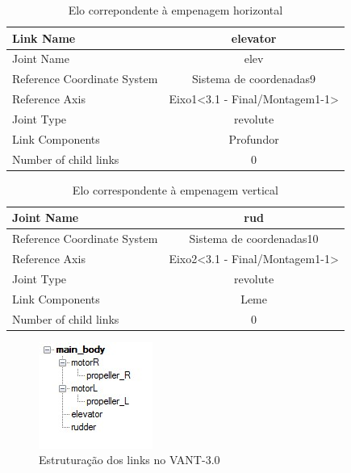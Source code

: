 \begin{table}[htbp]
\centering
\begin{tabular}{|l|c|c|c|c|}
\hline
Link Name  & \multicolumn{4}{c|}{elevator} \\
\hline
Joint Name  & \multicolumn{4}{c|}{elev} \\
\hline
Reference Coordinate System   & \multicolumn{4}{c|}{Sistema de coordenadas9} \\
\hline
Reference Axis  & \multicolumn{4}{c|}{Eixo1<3.1 - Final/Montagem1-1>} \\
\hline
Joint Type  & \multicolumn{4}{c|}{revolute} \\
\hline
Link Components   & \multicolumn{4}{c|}{Profundor} \\
\hline
Number of child links  & \multicolumn{4}{c|}{0} \\
\hline
\end{tabular}%
\caption{Elo correpondente à empenagem horizontal}
\label{tab:empenagemhorizontal}%
\end{table}%

\begin{table}[htbp]
\centering
\begin{tabular}{|l|c|c|c|c|}
\hline
Joint Name  & \multicolumn{4}{c|}{rud} \\
\hline
Reference Coordinate System   & \multicolumn{4}{c|}{Sistema de coordenadas10} \\
\hline
Reference Axis  & \multicolumn{4}{c|}{Eixo2<3.1 - Final/Montagem1-1>} \\
\hline
Joint Type  & \multicolumn{4}{c|}{revolute} \\
\hline
Link Components   & \multicolumn{4}{c|}{Leme} \\
\hline
Number of child links  & \multicolumn{4}{c|}{0} \\
\hline
\end{tabular}%
\caption{Elo correspondente à empenagem vertical}
\label{tab:empenagemvertical}%
\end{table}%



\begin{figure}[!htb]%
\centering %
\includegraphics[scale=1.3]{Imagens/ArvoreCheia.jpg} %
\caption{Estruturação dos links no VANT-3.0} %
\end{figure} %


